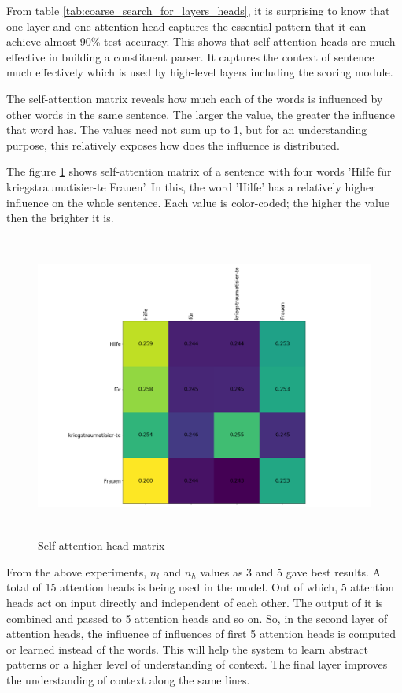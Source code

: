 \documentclass[a4paper, 11pt]{article}
\begin{document}
From table \ref{tab:coarse_search_for_layers_heads}, it is surprising to know that one layer and one attention head captures the essential pattern that it can achieve almost 90\% test accuracy. This shows that self-attention heads are much effective in building a constituent parser. It captures the context of sentence much effectively which is used by high-level layers including the scoring module.

The self-attention matrix reveals how much each of the words is influenced by other words in the same sentence. The larger the value, the greater the influence that word has. The values need not sum up to 1, but for an understanding purpose, this relatively exposes how does the influence is distributed. 

The figure \ref{fig:self-attention-head-matrix} shows self-attention matrix of a sentence with four words 'Hilfe für kriegstraumatisier-te Frauen'. In this, the word 'Hilfe' has a relatively higher influence on the whole sentence. Each value is color-coded; the higher the value then the brighter it is.

\begin{figure}[H]
    \centering
    \includegraphics[width=\textwidth,height=10cm,keepaspectratio=true]
    {attention-head-matrix.png}
    \caption{
        Self-attention head matrix
    }
    \label{fig:self-attention-head-matrix}
\end{figure}

From the above experiments, $n_l$ and $n_h$ values as 3 and 5 gave best results. A total of 15 attention heads is being used in the model. Out of which, 5 attention heads act on input directly and independent of each other. The output of it is combined and passed to 5 attention heads and so on.  So, in the second layer of attention heads, the influence of influences of first 5 attention heads is computed or learned instead of the words. This will help the system to learn abstract patterns or a higher level of understanding of context. The final layer improves the understanding of context along the same lines.
\end{document}
